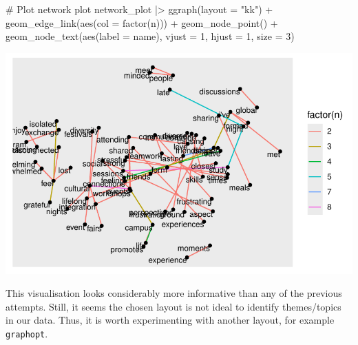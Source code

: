 \documentclass[
  letterpaper,
]{krantz}
\makeatletter
\newenvironment{Shaded}{\begin{snugshade}}{\end{snugshade}}
\newcommand{\AttributeTok}[1]{\textcolor[rgb]{0.40,0.45,0.13}{#1}}
\newcommand{\CommentTok}[1]{\textcolor[rgb]{0.37,0.37,0.37}{#1}}
\newcommand{\DecValTok}[1]{\textcolor[rgb]{0.68,0.00,0.00}{#1}}
\newcommand{\FunctionTok}[1]{\textcolor[rgb]{0.28,0.35,0.67}{#1}}
\newcommand{\NormalTok}[1]{\textcolor[rgb]{0.00,0.23,0.31}{#1}}
\newcommand{\SpecialCharTok}[1]{\textcolor[rgb]{0.37,0.37,0.37}{#1}}
\newcommand{\StringTok}[1]{\textcolor[rgb]{0.13,0.47,0.30}{#1}}
\newenvironment{kframe}{%
\medskip{}
\setlength{\fboxsep}{.8em}
 \def\at@end@of@kframe{}%
 \ifinner\ifhmode%
  \def\at@end@of@kframe{\end{minipage}}%
  \begin{minipage}{\columnwidth}%
 \fi\fi%
 \def\FrameCommand##1{\hskip\@totalleftmargin \hskip-\fboxsep
 \colorbox{shadecolor}{##1}\hskip-\fboxsep
     \hskip-\linewidth \hskip-\@totalleftmargin \hskip\columnwidth}%
 \MakeFramed {\advance\hsize-\width
   \@totalleftmargin\z@ \linewidth\hsize
   \@setminipage}}%
 {\par\unskip\endMakeFramed%
 \at@end@of@kframe}
\renewenvironment{Shaded}{\begin{kframe}}{\end{kframe}}
\makeatother
\begin{document}
\begin{Shaded}
\begin{Highlighting}[]
\CommentTok{\# Plot network plot}
\NormalTok{network\_plot }\SpecialCharTok{|\textgreater{}}
  \FunctionTok{ggraph}\NormalTok{(}\AttributeTok{layout =} \StringTok{"kk"}\NormalTok{) }\SpecialCharTok{+}
  \FunctionTok{geom\_edge\_link}\NormalTok{(}\FunctionTok{aes}\NormalTok{(}\AttributeTok{col =} \FunctionTok{factor}\NormalTok{(n))) }\SpecialCharTok{+}
  \FunctionTok{geom\_node\_point}\NormalTok{() }\SpecialCharTok{+}
  \FunctionTok{geom\_node\_text}\NormalTok{(}\FunctionTok{aes}\NormalTok{(}\AttributeTok{label =}\NormalTok{ name),}
                 \AttributeTok{vjust =} \DecValTok{1}\NormalTok{,}
                 \AttributeTok{hjust =} \DecValTok{1}\NormalTok{,}
                 \AttributeTok{size =} \DecValTok{3}\NormalTok{)}
\end{Highlighting}
\end{Shaded}

\includegraphics{14_mixed_methods_files/figure-pdf/ngrams-network-plot-step-three-1.pdf}

This visualisation looks considerably more informative than any of the
previous attempts. Still, it seems the chosen layout is not ideal to
identify themes/topics in our data. Thus, it is worth experimenting with
another layout, for example \texttt{graphopt}.
\end{document}
